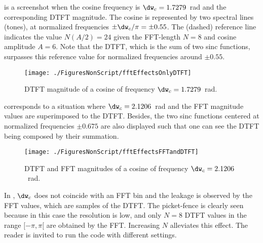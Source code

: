  is a screenshot when the cosine frequency is $\dw_c=1.7279$~rad and the corresponding DTFT magnitude. The cosine is represented by two spectral lines (tones), at normalized frequencies $\pm \dw_c/\pi= \pm 0.55$. The (dashed) reference line indicates the value $N(A/2)=24$ given the FFT-length $N=8$ and cosine amplitude $A=6$. Note that the DTFT, which is the sum of two sinc functions, surpasses this reference value for normalized frequencies around $\pm 0.55$.

\begin{figure}[htbp]
\centering
\texttt{[image: ./FiguresNonScript/fftEffectsOnlyDTFT]}
\caption{DTFT magnitude of a cosine of frequency $\dw_c=1.7279$~rad.\label{fig:fftEffectsOnlyDTFT}}
\end{figure}

 corresponds to a situation where $\dw_c=2.1206$~rad and the FFT magnitude values are superimposed to the DTFT. Besides, the two sinc functions centered at normalized frequencies $\pm 0.675$ are also displayed such that one can see the DTFT being composed by their summation.  

\begin{figure}[htbp]
\centering
\texttt{[image: ./FiguresNonScript/fftEffectsFFTandDTFT]}
\caption{DTFT and FFT magnitudes of a cosine of frequency $\dw_c=2.1206$~rad.\label{fig:fftEffectsFFTandDTFT}}
\end{figure}

In , $\dw_c$ does not coincide with an FFT bin and the leakage is observed by the FFT values, which are samples of the DTFT. The picket-fence is clearly seen because in this case the resolution is low, and only $N=8$ DTFT values in the range $[-\pi, \pi[$ are obtained by the FFT. Increasing $N$ alleviates this effect. The reader is invited to run the code with different settings.
\eApplication

